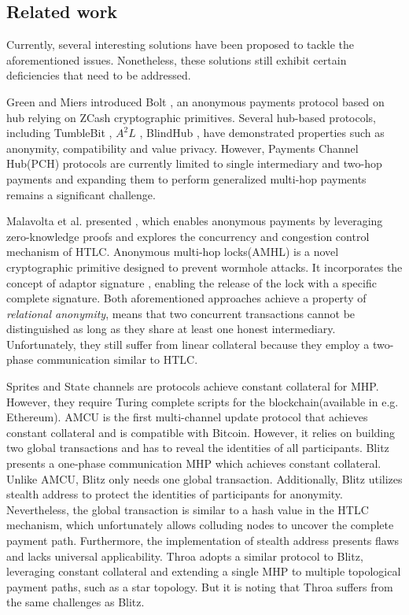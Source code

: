 \documentclass[conference]{IEEEtran}
\begin{document}
\subsection{Related work}
Currently, several interesting solutions have been proposed to tackle the aforementioned issues. Nonetheless, these solutions 
still exhibit certain deficiencies that need to be addressed.

Green and Miers introduced Bolt \cite{bolt}, an anonymous payments protocol based on hub relying on ZCash \cite{zerocash} cryptographic 
primitives. Several hub-based protocols, including TumbleBit \cite{tumblebit}, $A^{2}L$ \cite{a2l}, BlindHub \cite{blindhub}, have demonstrated 
properties such as anonymity, compatibility and value privacy. However, Payments Channel Hub(PCH) protocols are currently 
limited to single intermediary and two-hop payments and expanding them to perform generalized multi-hop payments remains a 
significant challenge.

Malavolta et al. presented \cite{mhtlc}, which enables anonymous payments by leveraging zero-knowledge proofs and explores 
the concurrency and congestion control mechanism of HTLC. Anonymous multi-hop locks(AMHL) \cite{amhl} is a novel cryptographic 
primitive designed to prevent wormhole attacks. It incorporates the concept of adaptor signature \cite{gc}, enabling 
the release of the lock with a specific complete signature. Both aforementioned approaches achieve a property of \textit{relational anonymity}, 
means that  two concurrent transactions cannot be distinguished as long as they share at least one honest intermediary. Unfortunately, they 
still suffer from linear collateral because they employ a two-phase communication similar to HTLC. 

Sprites \cite{sprites} and State channels \cite{sc} are protocols achieve constant collateral for MHP. However, they require 
Turing complete scripts for the blockchain(available in e.g. Ethereum). AMCU \cite{amcu} is the first multi-channel update protocol that achieves 
constant collateral and is compatible with Bitcoin. However, it relies on building two global transactions and has to reveal the identities 
of all participants. Blitz \cite{blitz} presents a one-phase communication MHP which achieves constant collateral. Unlike AMCU, Blitz only 
needs one global transaction. Additionally, Blitz utilizes stealth address \cite{stadd} to protect the identities of participants for anonymity. Nevertheless, 
the global transaction is similar to a hash value in the HTLC mechanism, which unfortunately allows colluding nodes to uncover the 
complete payment path. Furthermore, \cite{astrape} the implementation of stealth address presents flaws and lacks universal applicability. 
Throa \cite{th} adopts a similar protocol to Blitz, leveraging constant collateral and extending a single MHP to multiple 
topological payment paths, such as a star topology. But it is noting that Throa suffers from the same challenges as Blitz.
\end{document}

